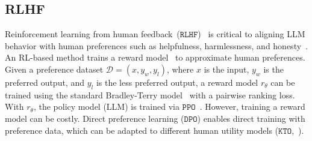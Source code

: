 \subsection{RLHF}
Reinforcement learning from human feedback~($\mathtt{RLHF}$)~\citep{bai2022training, wang2023helpsteer, ouyang2022training, dong2024rlhf} is critical to aligning LLM behavior with human preferences such as helpfulness, harmlessness, and honesty~\citep{ganguli2022red, achiam2023gpt, team2023gemini}. An RL-based method trains a reward model~\citep{liu2024skywork} to approximate human preferences. Given a preference dataset $\mathcal{D} = (x, y_w, y_l)$, where $x$ is the input, $y_w$ is the preferred output, and $y_l$ is the less preferred output, a reward model $r_\theta$ can be trained using the standard Bradley-Terry model~\citep{bradley1952rank} with a pairwise ranking loss. With $r_\theta$, the policy model (LLM) is trained via $\mathtt{PPO}$~\citep{schulman2017proximal}.
However, training a reward model can be costly. Direct preference learning ($\mathtt{DPO}$) \cite{rafailov2024direct} enables direct training with preference data, which can be adapted to different human utility models ($\mathtt{KTO}$,~\citet{ethayarajh2024kto}).






